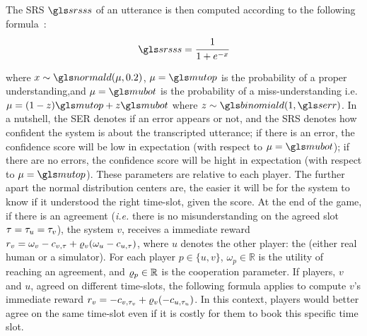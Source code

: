 The \acrfull{SRS} $\srs$ of an utterance is then computed according to the following formula~\parencite{Khouzaimi2015}:
%
\begin{equation*}
    \srs = \cfrac{1}{1+e^{-x}}
\end{equation*}

where $x \sim \normal(\mu,0.2)$, $\mu = \mutop$ is the probability of a proper understanding,and $\mu=\mubot$ is the probability of a
miss-understanding i.e. $\mu =  (1-z) \mutop  + z \mubot$ where $z\sim \binomial(1,\ser)$. In a nutshell, the \gls{SER} denotes if an error appears or not, and the \gls{SRS} denotes how confident the system is about the transcripted utterance; if there is an error, the confidence score will be low in expectation (with respect to $\mu=\mubot$); if there are no errors, the confidence score will be hight in expectation (with respect to $\mu = \mutop$). These parameters are relative to each player. The further apart the normal distribution centers are, the easier it will be for the system to know if it understood the right time-slot, given the score. At the end of the game, if there is an agreement (\textit{i.e.} there is no misunderstanding on the agreed slot $\tau = \tau_u = \tau_v$), the system $v$, receives a immediate reward $r_v =  \omega_v - c_{v,\tau} + \varrho_v (\omega_u-c_{u,\tau})$, where $u$ denotes the other player: the  (either real human or a  simulator). For each player $p\in\{u,v\}$, $\omega_p \in \mathbb{R}$ is the utility of reaching an agreement, and $\varrho_p \in \mathbb{R}$ is the cooperation parameter. If players, $v$ and $u$, agreed on different time-slots, the following formula applies to compute $v$'s immediate reward $r_v = - c_{v,\tau_v} + \varrho_v (-c_{u,\tau_u})$. In this context, players would better agree on the same time-slot even if it is costly for them to book this specific time slot.

% 


